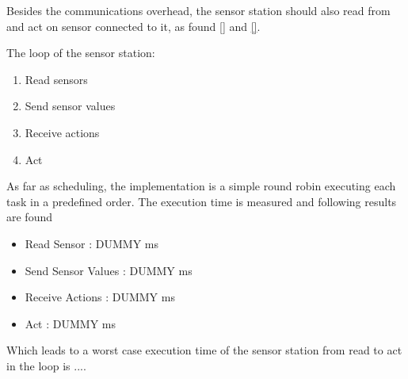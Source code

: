 Besides the communications overhead, the sensor station should also read from and act on sensor connected to it,  as found \cref{} and \cref{}.

The loop of the sensor station:
\begin{enumerate}
  \item Read sensors
  \item Send sensor values
  \item Receive actions
  \item Act
\end{enumerate}

As far as scheduling, the implementation is a simple round robin executing each task in a predefined order. The execution time is measured and following results are found
 \begin{itemize}
  \item Read Sensor : DUMMY ms
  \item Send Sensor Values : DUMMY ms
  \item Receive Actions : DUMMY ms
  \item Act : DUMMY ms 
\end{itemize}

Which leads to a worst case execution time of the sensor station from read to act in the loop is .... 
